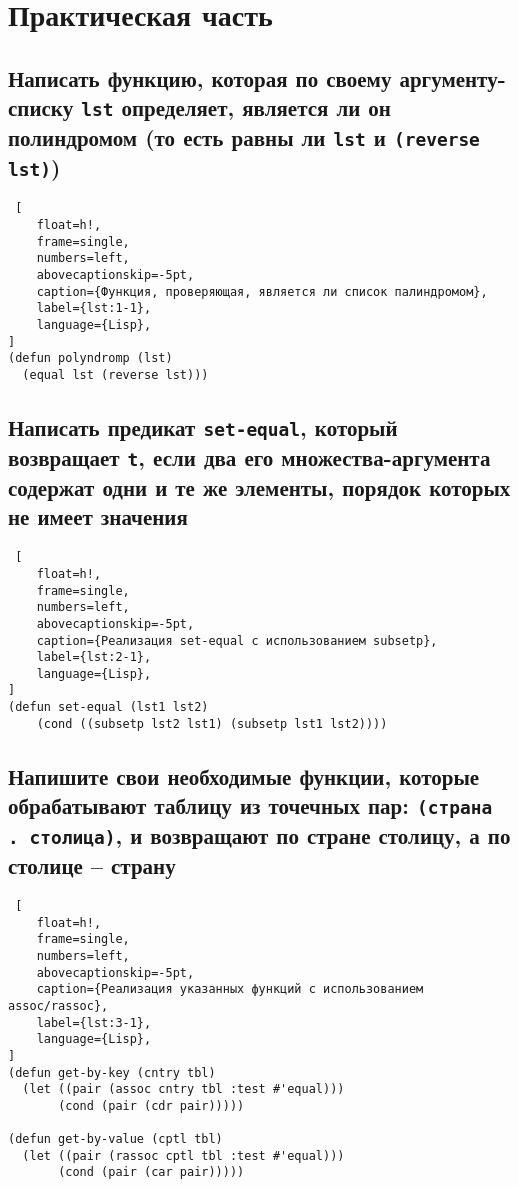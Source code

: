 \chapter{Практическая часть}

\section{Написать функцию, которая по своему аргументу-списку \texttt{lst} определяет, является ли он полиндромом (то есть равны ли \texttt{lst} и \texttt{(reverse lst)})}

\begin{lstlisting} [
	float=h!,
	frame=single,
	numbers=left,
	abovecaptionskip=-5pt,
	caption={Функция, проверяющая, является ли список палиндромом},
	label={lst:1-1},
	language={Lisp},
]
(defun polyndromp (lst)
  (equal lst (reverse lst)))
\end{lstlisting}

\section{Написать предикат \texttt{set-equal}, который возвращает \texttt{t}, если два его множества-аргумента содержат одни и те же элементы, порядок которых не имеет значения}

\begin{lstlisting} [
	float=h!,
	frame=single,
	numbers=left,
	abovecaptionskip=-5pt,
	caption={Реализация set-equal с использованием subsetp},
	label={lst:2-1},
	language={Lisp},
]
(defun set-equal (lst1 lst2)
    (cond ((subsetp lst2 lst1) (subsetp lst1 lst2))))
\end{lstlisting}

\section{Напишите свои необходимые функции, которые обрабатывают таблицу из точечных пар: \texttt{(страна . столица)}, и возвращают по стране столицу, а по столице -- страну}

\begin{lstlisting} [
	float=h!,
	frame=single,
	numbers=left,
	abovecaptionskip=-5pt,
	caption={Реализация указанных функций с использованием assoc/rassoc},
	label={lst:3-1},
	language={Lisp},
]
(defun get-by-key (cntry tbl)
  (let ((pair (assoc cntry tbl :test #'equal)))
       (cond (pair (cdr pair)))))

(defun get-by-value (cptl tbl)
  (let ((pair (rassoc cptl tbl :test #'equal)))
       (cond (pair (car pair)))))
\end{lstlisting}

